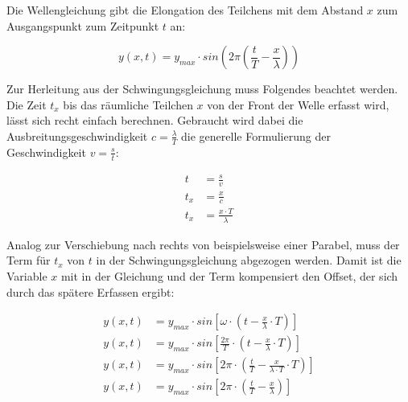 Die Wellengleichung gibt die Elongation des Teilchens mit dem Abstand $x$ zum Ausgangspunkt zum Zeitpunkt $t$ an:

\begin{equation} \label{eq:wellengleichung_y}
	y(x,t) = y_{max} \cdot sin{ (2\pi(\frac{t}{T}-\frac{x}{\lambda})) }
\end{equation}

Zur Herleitung aus der Schwingungsgleichung muss Folgendes beachtet werden. Die Zeit $t_x$ bis das räumliche Teilchen $x$ von der Front der Welle erfasst wird, lässt sich recht einfach berechnen. Gebraucht wird dabei die Ausbreitungsgeschwindigkeit $c=\frac{\lambda}{T}$ die generelle Formulierung der Geschwindigkeit $v=\frac{s}{t}$:

\begin{align*}
	t   &= \frac{s}{v} \\
	t_x &= \frac{x}{c} \\
	t_x &= \frac{x \cdot T}{\lambda}
\end{align*}

Analog zur Verschiebung nach rechts von beispielsweise einer Parabel, muss der Term für $t_x$ von $t$ in der Schwingungsgleichung abgezogen werden. Damit ist die Variable $x$ mit in der Gleichung und der Term \glqq kompensiert\grqq{} den \glqq Offset\grqq{}, der sich durch das spätere Erfassen ergibt:

\begin{align*}
	y(x,t) &= y_{max} \cdot sin{[\omega \cdot (t-\frac{x}{\lambda} \cdot T)]} \\
	y(x,t) &= y_{max} \cdot sin{[\frac{2\pi}{T} \cdot (t-\frac{x}{\lambda} \cdot T)]} \\
	y(x,t) &= y_{max} \cdot sin{[2\pi \cdot (\frac{t}{T}-\frac{x}{\lambda \cdot T} \cdot T)]} \\
	y(x,t) &= y_{max} \cdot sin{[2\pi \cdot (\frac{t}{T}-\frac{x}{\lambda})]}
\end{align*}